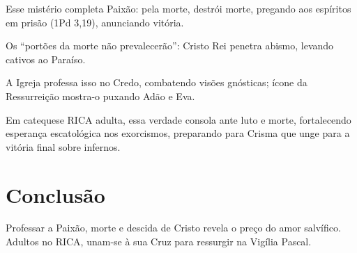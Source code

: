 Esse mistério completa Paixão: pela morte, destrói morte, pregando aos espíritos em prisão (1Pd 3,19), anunciando vitória.

Os ``portões da morte não prevalecerão'': Cristo Rei penetra abismo, levando cativos ao Paraíso.

A Igreja professa isso no Credo, combatendo visões gnósticas; ícone da Ressurreição mostra-o puxando Adão e Eva.

Em catequese RICA adulta, essa verdade consola ante luto e morte, fortalecendo esperança escatológica nos exorcismos, preparando para Crisma que unge para a vitória final sobre infernos.

\section{Conclusão}

Professar a Paixão, morte e descida de Cristo revela o preço do amor salvífico. Adultos no RICA, unam-se à sua Cruz para ressurgir na Vigília Pascal.